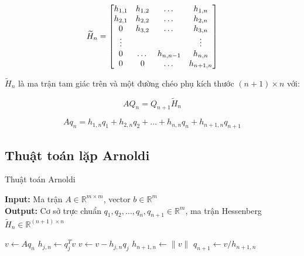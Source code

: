 \documentclass[14pt, a4paper]{article}
\numberwithin{equation}{section}
\numberwithin{algorithm}{section}
\numberwithin{figure}{section}
\numberwithin{dl}{section}
\numberwithin{md}{section}
\numberwithin{bd}{section}
\numberwithin{dn}{section}
\begin{document}
\begin{equation} \label{eq:Hessenberg_matrix}
    \widetilde{H}_n = \begin{bmatrix} h_{1,1} & h_{1, 2} & \dots & h_{1, n} \\
    h_{2, 1} & h_{2, 2} & \dots & h_{2, n} \\
    0 & h_{3, 2} & \dots  & h_{3, n} \\
    \vdots & \space & \space & \vdots \\
    0 & \dots & h_{n, n-1} & h_{n, n} \\
    0 & 0 & \dots & h_{n+1, n}\end{bmatrix}
\end{equation}

$\widetilde{H}_n$ là ma trận tam giác trên và một đường chéo phụ kích thước $(n+1)\times n$ với:

\begin{equation} \label{eq:A_projection}
    AQ_n = Q_{n+1}\widetilde{H}_n
\end{equation}

\begin{equation} \label{eq:recurrence_term}
    Aq_n = h_{1, n}q_1 + h_{2, n}q_2 + \dots + h_{n, n}q_n + h_{n+1, n}q_{n+1}
\end{equation}


\subsection{Thuật toán lặp Arnoldi}


\begin{algorithm}[h!]
    \caption{Thuật toán Arnoldi}\label{alg:Arnoldi}
    \hspace*{\algorithmicindent} \textbf{Input:} {Ma trận $A \in \mathbb{R}^{m \times m}$, vector $b \in \mathbb{R}^m$} \\
    \hspace*{\algorithmicindent} \textbf{Output:} {Cơ sở trực chuẩn $q_1, q_2, \dots, q_n, q_{n+1} \in \mathbb{R}^m$, ma trận Hessenberg $\widetilde{H}_n \in \mathbb{R}^{(n+1) \times n}$}
    \begin{algorithmic}
            \State $v \leftarrow Aq_n$
                \State $h_{j,n} \leftarrow q_j^T v$
                \State $v \leftarrow v - h_{j,n}q_j$
            \EndFor
            \State $h_{n+1,n} \leftarrow \lVert v \rVert$
            \State $q_{n+1} \leftarrow v/h_{n+1,n}$
        \EndFor
    \end{algorithmic}
\end{algorithm}
\end{document}
